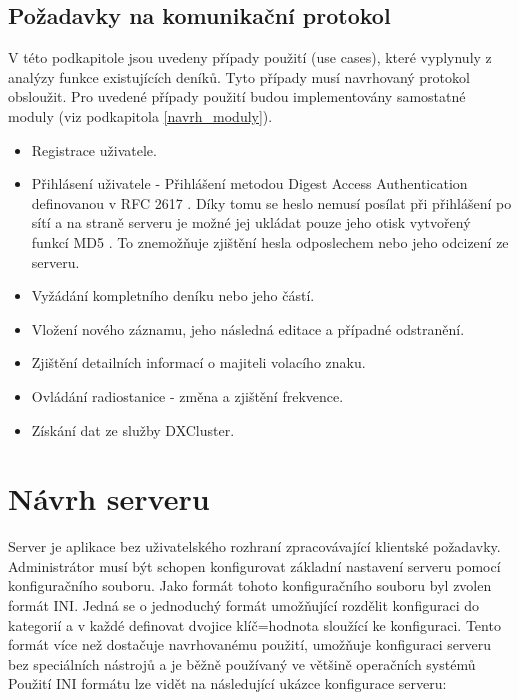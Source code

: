 \subsection{Požadavky na komunikační protokol}

V této podkapitole jsou uvedeny případy použití (use cases), které vyplynuly z
analýzy funkce existujících deníků. Tyto případy musí
navrhovaný protokol obsloužit. Pro uvedené případy použití
budou implementovány samostatné moduly (viz podkapitola \ref{navrh_moduly}).

\begin{itemize}
\item Registrace uživatele.
\item Přihlásení uživatele - Přihlášení metodou Digest Access Authentication definovanou v
RFC 2617 \cite{rfc2617}. 
Díky tomu se heslo nemusí posílat při přihlášení po sítí %
a na straně serveru je možné jej ukládat
pouze jeho otisk vytvořený funkcí MD5 \cite{md5}. To znemožňuje zjištění hesla odposlechem nebo jeho odcizení ze
serveru.
\item Vyžádání kompletního deníku nebo jeho částí.
\item Vložení nového záznamu, jeho následná editace a případné odstranění.
\item Zjištění detailních informací o majiteli volacího znaku.
\item Ovládání radiostanice - změna a zjištění frekvence.
\item Získání dat ze služby DXCluster.
\end{itemize}

\section{Návrh serveru}
\label{navrh_server}

Server je aplikace bez uživatelského rozhraní %
zpracovávající klientské požadavky. Administrátor musí být schopen konfigurovat základní nastavení serveru
pomocí konfiguračního souboru. Jako formát tohoto konfiguračního souboru byl zvolen formát INI.
Jedná se o jednoduchý formát umožňující rozdělit konfiguraci do kategorií
a v každé definovat dvojice klíč=hodnota sloužící ke konfiguraci. Tento formát více než dostačuje 
navrhovanému použití, umožňuje konfiguraci serveru bez speciálních nástrojů a je běžně používaný
ve většině operačních systémů
Použití INI formátu lze vidět na následující
ukázce konfigurace serveru:

